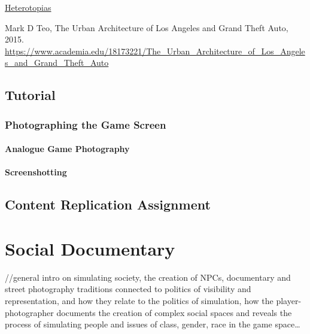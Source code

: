 \documentclass[
  openany]{book}
\begin{document}
\href{https://www.heterotopiaszine.com/}{Heterotopias}

Mark D Teo, The Urban Architecture of Los Angeles and Grand Theft Auto, 2015. \url{https://www.academia.edu/18173221/The_Urban_Architecture_of_Los_Angeles_and_Grand_Theft_Auto}

\hypertarget{tutorial}{%
\section*{Tutorial}\label{tutorial}}

\hypertarget{photographing-the-game-screen}{%
\subsection*{Photographing the Game Screen}\label{photographing-the-game-screen}}

\hypertarget{analogue-game-photography}{%
\subsubsection*{Analogue Game Photography}\label{analogue-game-photography}}

\hypertarget{screenshotting}{%
\subsubsection*{Screenshotting}\label{screenshotting}}

\hypertarget{content-replication-assignment}{%
\section*{Content Replication Assignment}\label{content-replication-assignment}}

\hypertarget{social-documentary}{%
\chapter{Social Documentary}\label{social-documentary}}

//general intro on simulating society, the creation of NPCs, documentary and street photography traditions connected to politics of visibility and representation, and how they relate to the politics of simulation, how the player-photographer documents the creation of complex social spaces and reveals the process of simulating people and issues of class, gender, race in the game space\ldots{}
\end{document}
